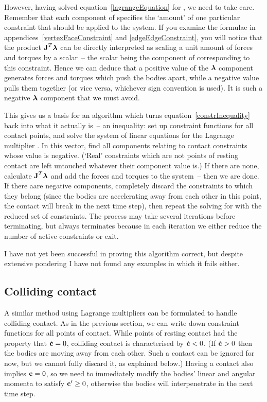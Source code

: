 However, having solved equation~\ref{lagrangeEquation} for \ve{\lambda}, we need to take care.
Remember that each component of \ve{\lambda} specifies the `amount' of one particular constraint
that should be applied to the system. If you examine the formulae in
appendices~\ref{vertexFaceConstraint} and \ref{edgeEdgeConstraint}, you will notice that the
product $\m{J}^T\ve{\lambda}$ can be directly interpreted as scaling a unit amount of forces and
torques by a scalar~-- the scalar being the component of \ve{\lambda} corresponding to this
constraint. Hence we can deduce that a positive value of the $\ve{\lambda}$ component generates
forces and torques which push the bodies apart, while a negative value pulls them together (or
vice versa, whichever sign convention is used). It is such a negative $\ve{\lambda}$ component
that we must avoid.

This gives us a basis for an algorithm which turns equation~\ref{constrInequality} back into what
it actually is~-- an inequality: set up constraint functions for all contact points, and solve the
system of linear equations for the Lagrange multiplier \ve{\lambda}. In this vector, find all
components relating to contact constraints whose value is negative. (`Real' constraints which are
not points of resting contact are left untouched whatever their \ve{\lambda} component value is.)
If there are none, calculate $\m{J}^T\ve{\lambda}$ and add the forces and torques to the system~--
then we are done. If there aare negative components, completely discard the constraints to which
they belong (since the bodies are accelerating away from each other in this point, the contact
will break in the next time step), then repeat the solving for \ve{\lambda} with the reduced set
of constraints. The process may take several iterations before terminating, but always terminates
because in each iteration we either reduce the number of active constraints or exit.

I have not yet been successful in proving this algorithm correct, but despite extensive pondering
I have not found any examples in which it fails either.

\subsection{Colliding contact}

A similar method using Lagrange multipliers can be formulated to handle colliding contact. As in
the previous section, we can write down constraint functions  for all points of contact.
While points of resting contact had the property that $\dot{\ve{c}} = 0$, colliding contact is
characterised by $\dot{\ve{c}} < 0$. (If $\dot{\ve{c}} > 0$ then the bodies are moving away from
each other. Such a contact can be ignored for now, but we cannot fully discard it, as explained
below.) Having a contact also implies $\ve{c} = 0$, so we need to immediately modify the bodies'
linear and angular momenta to satisfy $\ve{c}' \ge 0$, otherwise the bodies will interpenetrate
in the next time step.

